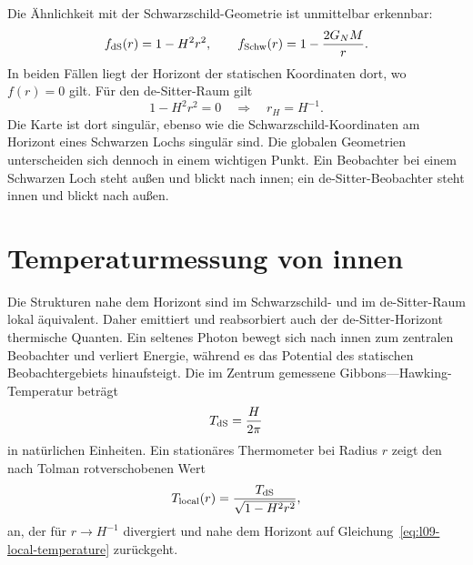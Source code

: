 Die Ähnlichkeit mit der Schwarzschild-Geometrie ist unmittelbar erkennbar:
\begin{equation}
f_{\rm dS}(r)=1-H^2r^2,
\qquad
f_{\rm Schw}(r)=1-\frac{2G_NM}{r}.
\end{equation}
In beiden Fällen liegt der Horizont der statischen Koordinaten dort, wo \(f(r)=0\) gilt. Für den de-Sitter-Raum gilt
\begin{equation}
1-H^2r^2=0
\quad\Longrightarrow\quad
r_H=H^{-1}.
\end{equation}
Die Karte ist dort singulär, ebenso wie die Schwarzschild-Koordinaten am Horizont eines Schwarzen Lochs singulär sind. Die globalen Geometrien unterscheiden sich dennoch in einem wichtigen Punkt. Ein Beobachter bei einem Schwarzen Loch steht außen und blickt nach innen; ein de-Sitter-Beobachter steht innen und blickt nach außen.

\begin{classroomqa}
\end{classroomqa}

\begin{classroomqa}
\end{classroomqa}

\section{Temperaturmessung von innen}

Die Strukturen nahe dem Horizont sind im Schwarzschild- und im de-Sitter-Raum lokal äquivalent. Daher emittiert und reabsorbiert auch der de-Sitter-Horizont thermische Quanten. Ein seltenes Photon bewegt sich nach innen zum zentralen Beobachter und verliert Energie, während es das Potential des statischen Beobachtergebiets hinaufsteigt. Die im Zentrum gemessene Gibbons---Hawking-Temperatur beträgt
\begin{equation}
T_{\rm dS}=\frac{H}{2\pi}
\label{eq:l09-de-sitter-temperature}
\end{equation}
in natürlichen Einheiten. Ein stationäres Thermometer bei Radius \(r\) zeigt den nach Tolman rotverschobenen Wert
\begin{equation}
T_{\rm local}(r)=
\frac{T_{\rm dS}}{\sqrt{1-H^2r^2}},
\label{eq:l09-tolman}
\end{equation}
an, der für \(r\to H^{-1}\) divergiert und nahe dem Horizont auf Gleichung~\eqref{eq:l09-local-temperature} zurückgeht.

